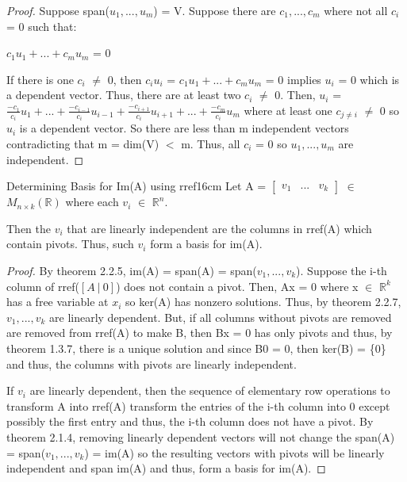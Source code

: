 \begin{proof}
        \vspace{0.2cm}

        Suppose span($u_1,...,u_m$) = V.
        Suppose there are $c_1,...,c_m$ where not all $c_i$ = 0 such that:

        \hspace{0.5cm}
        $c_1u_1 + ... + c_mu_m$ = 0

        If there is one $c_i$ $\not =$ 0, then
        $c_iu_i$ = $c_1u_1 + ... + c_mu_m$ = 0 implies $u_i$ = 0
        which is a dependent vector. Thus, there are at least two
        $c_i$ $\not =$ 0. Then, $u_i$ =
        $\frac{-c_1}{c_i}u_1 + ... + \frac{-c_{i-1}}{c_i}u_{i-1}
        + \frac{-c_{i+1}}{c_i}u_{i+1} + ... + \frac{-c_m}{c_i}u_m$
        where at least one $c_{j \not = i}$ $\not =$ 0
        so $u_i$ is a dependent vector. So there are less than m
        independent vectors contradicting that m = dim(V) $<$ m.
        Thus, all $c_i$ = 0 so $u_1,...,u_m$ are independent.
    \end{proof}

    \vspace{0.5cm}



    \begin{wtheorem}{Determining Basis for Im(A) using rref}{16cm}
        Let A =
        $\begin{bmatrix}
            v_1 & ... & v_k
        \end{bmatrix}$ $\in$ $M_{n \times k}(\mathbb{R})$
        where each $v_i$ $\in$ $\mathbb{R}^n$.

        Then the $v_i$ that are linearly independent are the columns in rref(A)
        which contain pivots.
        Thus, such $v_i$ form a basis for im(A).
    \end{wtheorem}

    \begin{proof}
        By {\color{red} theorem 2.2.5}, im(A) = span(A) = span($v_1,...,v_k$).
        Suppose the i-th column of rref($[A \ | \ 0]$) does not contain a pivot.
        Then, Ax = 0 where x $\in$ $\mathbb{R}^k$ has a free variable at $x_i$
        so ker(A) has nonzero solutions.
        Thus, by {\color{red} theorem 2.2.7}, $v_1,...,v_k$
        are linearly dependent.
        But, if all columns without pivots are removed are removed from rref(A)
        to make B, then Bx = 0 has only pivots and thus, by
        {\color{red} theorem 1.3.7}, there is a unique solution
        and since B0 = 0, then ker(B) = \{0\}
        and thus, the columns with pivots are linearly independent.

        If $v_i$ are linearly dependent, then
        the sequence of elementary row operations to transform A into rref(A)
        transform the entries of the i-th column into 0 except possibly
        the first entry and thus, the i-th column does not have a pivot.
        By {\color{red} theorem 2.1.4}, removing linearly dependent vectors
        will not change the span(A) = span($v_1,...,v_k$) = im(A)
        so the resulting vectors with pivots will be linearly independent
        and span im(A) and thus, form a basis for im(A).
    \end{proof}

